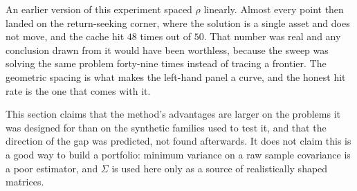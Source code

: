 An earlier version of this experiment spaced $\rho$ linearly. Almost every point
then landed on the return-seeking corner, where the solution is a single asset and
does not move, and the cache hit $48$ times out of $50$. That number was real and
any conclusion drawn from it would have been worthless, because the sweep was
solving the same problem forty-nine times instead of tracing a frontier. The
geometric spacing is what makes the left-hand panel a curve, and the honest hit
rate is the one that comes with it.

This section claims that the method's advantages are larger on the problems it was
designed for than on the synthetic families used to test it, and that the direction
of the gap was predicted, not found afterwards. It does not claim this is a
good way to build a portfolio: minimum variance on a raw sample covariance is a
poor estimator, and $\Sigma$ is used here only as a source of realistically shaped
matrices.
